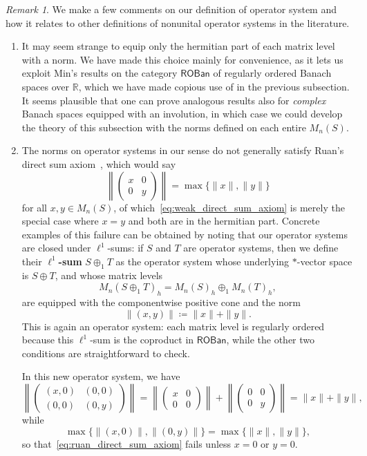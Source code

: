 \documentclass[11pt,onecolumn]{article}
\newcommand{\R}{\mathbb{R}}
\newcommand{\ROBan}{\mathsf{ROBan}}
\theoremstyle{plain}
\theoremstyle{remark}
\newtheorem{remark}[remark]{Remark}
\theoremstyle{definition}
\begin{document}
\begin{remark}
	\label{rem:os_comments}
	We make a few comments on our definition of operator system and how it relates to other definitions of nonunital operator systems in the literature.
	\begin{enumerate}
		\item It may seem strange to equip only the hermitian part of each matrix level with a norm.
			We have made this choice mainly for convenience, as it lets us exploit Min's results on the category $\ROBan$ of regularly ordered Banach spaces over $\R$,
			which we have made copious use of in the previous subsection.
			It seems plausible that one can prove analogous results also for \emph{complex} Banach spaces equipped with an involution,
			in which case we could develop the theory of this subsection with the norms defined on each entire $M_n(S)$.
			\item The norms on operator systems in our sense do not generally satisfy Ruan's direct sum axiom~\cite{RuanOperatorSpaces}, which would say
			\begin{equation}
				\label{eq:ruan_direct_sum_axiom}
				\left\|
				\begin{pmatrix}
					x & 0 \\
					0 & y
				\end{pmatrix}
				\right\|
				=
				\max\{\|x\|,\|y\|\}
			\end{equation}
			for all $x, y \in M_n(S)$, of which~\eqref{eq:weak_direct_sum_axiom} is merely the special case where $x=y$ and both are in the hermitian part.
			Concrete examples of this failure can be obtained by noting that our operator systems are closed under $\ell^1$-sums:
			if $S$ and $T$ are operator systems, then we define their \textbf{$\ell^1$-sum} $S \oplus_1 T$
			as the operator system whose underlying $*$-vector space is $S\oplus T$,
			and whose matrix levels
			\[
				M_n(S\oplus_1 T)_h
				=
				M_n(S)_h \oplus_1 M_n(T)_h,
			\]
			are equipped with the componentwise positive cone and the norm
			\[
				\|(x,y)\| \coloneqq \|x\|+\|y\|.
			\]
			This is again an operator system:
			each matrix level is regularly ordered because this $\ell^1$-sum is the coproduct in $\ROBan$,
			while the other two conditions are straightforward to check.

			In this new operator system, we have
			\[
				\left\|
				\begin{pmatrix}
					(x,0) & (0,0) \\
					(0,0) & (0,y)
				\end{pmatrix}
				\right\|
				=
				\left\|
				\begin{pmatrix}
					x & 0 \\
					0 & 0
				\end{pmatrix}
				\right\|
				+
				\left\|
				\begin{pmatrix}
					0 & 0 \\
					0 & y
				\end{pmatrix}
				\right\|
				= \|x\| + \|y\|,
			\]
			while
			\[
				\max\{\|(x,0)\|,\|(0,y)\|\} = \max\{\|x\|,\|y\|\},
			\]
			so that~\eqref{eq:ruan_direct_sum_axiom} fails unless $x=0$ or $y=0$.


\end{enumerate}
\end{remark}
\end{document}
